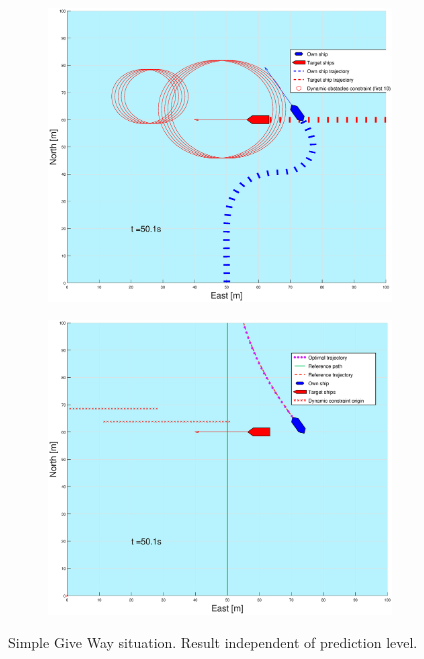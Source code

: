 \begin{figure}[ht!]
\begin{subfigure}[b]{0.499\textwidth}
    \end{subfigure}
    \hfill
    \\
    \begin{subfigure}[b]{0.49\textwidth}
        \centering
        \includegraphics[width=\textwidth]{Images/Figures/enkel_GW/_Simple_0fig1_time=50}
    \end{subfigure}
    \hfill
    \begin{subfigure}[b]{0.499\textwidth}
        \centering
        \includegraphics[width=\textwidth]{Images/Figures/enkel_GW/_Simple_0fig999_time=50}
    \end{subfigure}
    \hfill
    \caption{Simple Give Way situation. Result independent of prediction level.}
\end{figure}%
